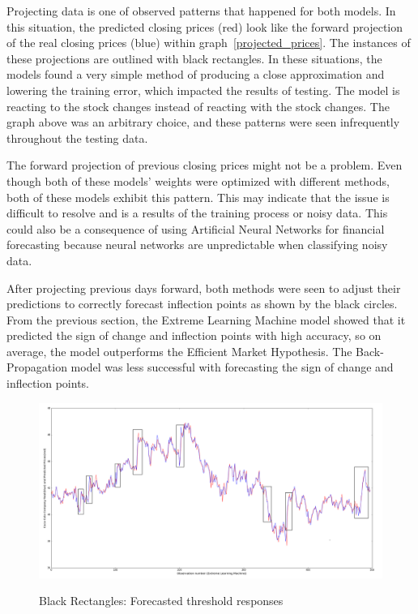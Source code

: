 Projecting data is one of observed patterns that happened for both models.
In this situation, the predicted closing prices (red) look like the forward projection of the real closing prices (blue) within graph~\ref{projected_prices}.
The instances of these projections are outlined with black rectangles.
In these situations, the models found a very simple method of producing a close approximation and lowering the training error, which impacted the results of testing.
The model is reacting to the stock changes instead of reacting with the stock changes.
The graph above was an arbitrary choice, and these patterns were seen infrequently throughout the testing data.

The forward projection of previous closing prices might not be a problem.
Even though both of these models' weights were optimized with different methods, both of these models exhibit this pattern.
This may indicate that the issue is difficult to resolve and is a results of the training process or noisy data.
This could also be a consequence of using Artificial Neural Networks for financial forecasting because neural networks are unpredictable when classifying noisy data.

After projecting previous days forward, both methods were seen to adjust their predictions to correctly forecast inflection points as shown by the black circles.
From the previous section, the Extreme Learning Machine model showed that it predicted the sign of change and inflection points with high accuracy, so on average, the model outperforms the Efficient Market Hypothesis.
The Back-Propagation model was less successful with forecasting the sign of change and inflection points.

\begin{figure}
	\begin{center}
	\resizebox{\textwidth}{!} {
	\includegraphics{images/threshold_response}}
	\caption{ Black Rectangles: Forecasted threshold responses }
	\label{threshold_responses}
	\end{center}
\end{figure}

